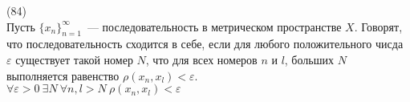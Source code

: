 (84)\\
Пусть $\{x_n\}^\infty_{n = 1}$~--- последовательность в метрическом пространстве $X$. Говорят, что последовательность сходится в себе, если для любого положительного чисда $\varepsilon$ существует такой номер $N$, что для всех номеров $n$ и $l$, больших $N$ выполняется равенство $\rho(x_n, x_l) < \varepsilon$.\\
$\forall \varepsilon > 0\ \exists N\ \forall n, l > N\ \rho(x_n, x_l) < \varepsilon$